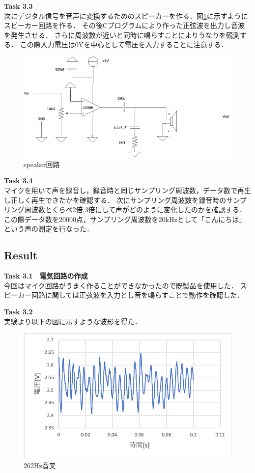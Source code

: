 \documentclass[11pt, a4paper,twocolumn]{jarticle}
\begin{document}
\noindent
\textbf{Task 3.3} \\
次にデジタル信号を音声に変換するためのスピーカーを作る．図\ref{fig:16}に示すようにスピーカー回路を作る．
その後Cプログラムにより作った正弦波を出力し音波を発生させる．
さらに周波数が近いと同時に鳴らすことによりうなりを観測する．
この際入力電圧は0Vを中心として電圧を入力することに注意する．

\begin{figure}[htbp]
 \begin{center}
  \includegraphics[width=0.8\linewidth]{fig16.png}
 \end{center}
 \caption{speaker回路}
 \label{fig:16}
\end{figure}

\noindent
\textbf{Task 3.4} \\
マイクを用いて声を録音し，録音時と同じサンプリング周波数，データ数で再生し正しく再生できたかを確認する．
次にサンプリング周波数を録音時のサンプリング周波数とくらべ2倍,3倍にして声がどのように変化したのかを確認する．
この際データ数を20000点，サンプリング周波数を20kHzとして「こんにちは」という声の測定を行なった．
\subsection{Result}
\noindent
\textbf{Task 3.1　電気回路の作成} \\
今回はマイク回路がうまく作ることができなかったので既製品を使用した．
スピーカー回路に関しては正弦波を入力とし音を鳴らすことで動作を確認した．

\noindent
\textbf{Task 3.2} \\
実験より以下の図に示すような波形を得た．

\begin{figure}[htbp]
 \begin{center}
  \includegraphics[width=0.8\linewidth]{fig17.png}
 \end{center}
 \caption{262Hz音叉}
 \label{fig:17}
\end{figure}
\end{document}
